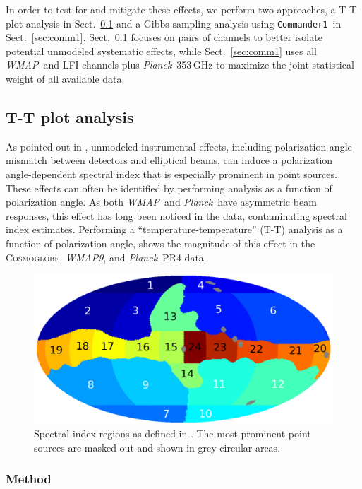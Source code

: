 \documentclass[twocolumn]{../../common/aa}
\def\WMAP{\emph{WMAP}}
\def\WMAPnine{\emph{WMAP9}}
\def\Planck{\emph{Planck}}
\def\commanderone{\texttt{Commander1}}
\newcommand{\cosmoglobe}{\textsc{Cosmoglobe}}
\begin{document}
In order to test for and mitigate these effects, we perform two approaches, a T-T plot analysis in Sect.~\ref{sec:tt_plot} and a Gibbs sampling analysis using \commanderone\ in Sect.~\ref{sec:comm1}. Sect.~\ref{sec:tt_plot} focuses on pairs of channels to better isolate potential unmodeled systematic effects, while Sect.~\ref{sec:comm1} uses all \WMAP\ and LFI channels plus \Planck\ 353\,GHz to maximize the joint statistical weight of all available data.

\subsection{T-T plot analysis}
\label{sec:tt_plot}

As pointed out in \citet{wehus:2013}, unmodeled instrumental effects, including polarization angle mismatch between detectors and  elliptical beams, can induce a polarization angle-dependent spectral index that is especially prominent in point sources.
These effects can often be identified by performing analysis as a function of polarization angle. As both \WMAP\ and \Planck\ have asymmetric beam responses, this effect has long been noticed in the data, contaminating spectral index estimates. Performing a ``temperature-temperature'' (T-T) analysis as a function of polarization angle, shows the magnitude of this effect in the \cosmoglobe, \WMAPnine, and \Planck\ PR4 data.


\begin{figure}
        \centering
        \includegraphics[width=\linewidth]{figures/utnymaske_tall_converted.pdf}
        \caption{Spectral index regions as defined in \citet{fuskeland2014}. The most prominent point sources are masked out and shown in grey circular areas.
        }
        \label{fig:regions}
\end{figure}

\subsubsection{Method}
\label{sec:tt_plot_method}
\end{document}
